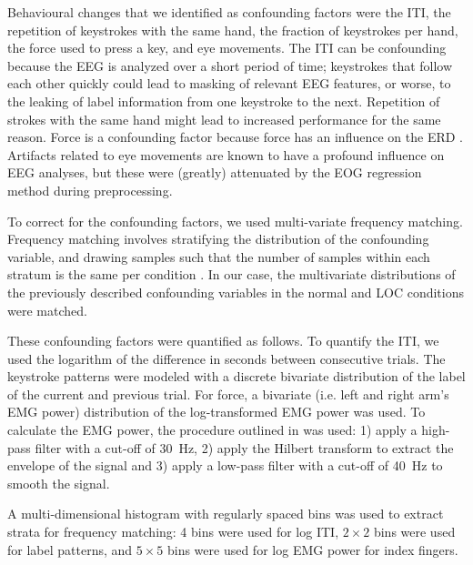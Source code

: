 \begin{sloppypar}
Behavioural changes that we identified as confounding factors were the \acf{ITI},
the repetition of keystrokes with the same hand, the fraction of keystrokes
per hand, the force used to press a key, and eye
movements.
%
The \ac{ITI} can be confounding because the \ac{EEG} is analyzed over a short
period of time; keystrokes that follow each other quickly could lead to
masking of relevant \ac{EEG} features, or worse, to the leaking of label
information from one keystroke to the next.
Repetition of strokes with the same hand might lead to increased performance
for the same reason.
%
Force is a confounding factor because force has an influence on the \ac{ERD}
\cite{stancak1997eel}.
%
Artifacts related to eye movements are known to have a profound influence
on \ac{EEG} analyses, but these were (greatly) attenuated by the \ac{EOG}
regression method during preprocessing.
\end{sloppypar}

To correct for the confounding factors, we used multi-variate frequency
matching. Frequency matching involves stratifying the distribution of the
confounding variable, and drawing samples such that the number of samples
within each stratum is the same per condition \cite{anderson1980smc}. In our
case, the multivariate distributions of the previously described confounding
variables in the normal and \ac{LOC} conditions were matched.

These confounding factors were quantified as follows. To quantify the \ac{ITI},
we used the logarithm of the difference in seconds between consecutive trials.
The keystroke patterns were modeled with a discrete bivariate distribution of
the label of the current and previous trial. For force, a bivariate (i.e. left
and right arm's \acs{EMG} power) distribution of the log-transformed \ac{EMG}
power was used. To calculate the \ac{EMG} power, the procedure outlined in
\cite{hof1984emg} was used: 
%
1) apply a high-pass filter with a cut-off of 30~Hz, 2) apply the Hilbert
transform to extract the envelope of the signal and 3) apply a low-pass filter
with a cut-off of 40~Hz to smooth the signal. 

A multi-dimensional histogram with regularly spaced bins was used to extract
strata for frequency matching: 4 bins were used for log \ac{ITI}, $2 \times 2$
bins were used for label patterns, and $5 \times 5$ bins were used for log
\ac{EMG} power for index fingers.

